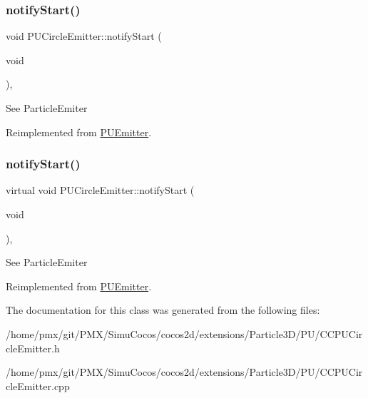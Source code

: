 \subsubsection{\texorpdfstring{notify\+Start()}{notifyStart()}\hspace{0.1cm}{\footnotesize\ttfamily [1/2]}}
{\footnotesize\ttfamily void P\+U\+Circle\+Emitter\+::notify\+Start (\begin{DoxyParamCaption}\item[{void}]{ }\end{DoxyParamCaption})\hspace{0.3cm}{\ttfamily [override]}, {\ttfamily [virtual]}}

See Particle\+Emiter 

Reimplemented from \hyperlink{classPUEmitter}{P\+U\+Emitter}.

\mbox{\label{classPUCircleEmitter_a15103e9de991e89334219a8d52bb66a3}} 
\subsubsection{\texorpdfstring{notify\+Start()}{notifyStart()}\hspace{0.1cm}{\footnotesize\ttfamily [2/2]}}
{\footnotesize\ttfamily virtual void P\+U\+Circle\+Emitter\+::notify\+Start (\begin{DoxyParamCaption}\item[{void}]{ }\end{DoxyParamCaption})\hspace{0.3cm}{\ttfamily [override]}, {\ttfamily [virtual]}}

See Particle\+Emiter 

Reimplemented from \hyperlink{classPUEmitter}{P\+U\+Emitter}.



The documentation for this class was generated from the following files\+:\begin{DoxyCompactItemize}
\item 
/home/pmx/git/\+P\+M\+X/\+Simu\+Cocos/cocos2d/extensions/\+Particle3\+D/\+P\+U/C\+C\+P\+U\+Circle\+Emitter.\+h\item 
/home/pmx/git/\+P\+M\+X/\+Simu\+Cocos/cocos2d/extensions/\+Particle3\+D/\+P\+U/C\+C\+P\+U\+Circle\+Emitter.\+cpp\end{DoxyCompactItemize}
